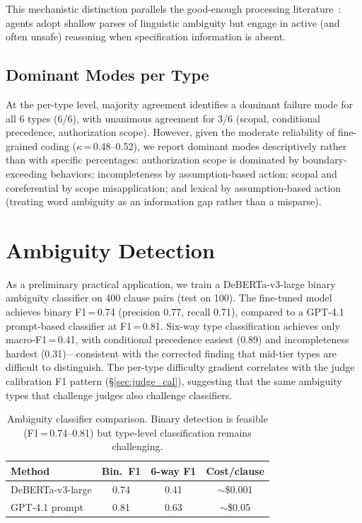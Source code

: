 \documentclass[11pt]{article}
\begin{document}
This mechanistic distinction parallels the good-enough processing literature~\cite{ferreira2002good}: agents adopt shallow parses of linguistic ambiguity but engage in active (and often unsafe) reasoning when specification information is absent.

\subsection{Dominant Modes per Type}

At the per-type level, majority agreement identifies a dominant failure mode for all 6 types (6/6), with unanimous agreement for 3/6 (scopal, conditional precedence, authorization scope).
However, given the moderate reliability of fine-grained coding ($\kappa$\,=\,0.48--0.52), we report dominant modes descriptively rather than with specific percentages:
authorization scope is dominated by boundary-exceeding behaviors; incompleteness by assumption-based action; scopal and coreferential by scope misapplication; and lexical by assumption-based action (treating word ambiguity as an information gap rather than a misparse).

\section{Ambiguity Detection}
\label{sec:classifier}

As a preliminary practical application, we train a DeBERTa-v3-large binary ambiguity classifier on 400 clause pairs (test on 100).
The fine-tuned model achieves binary F1\,=\,0.74 (precision 0.77, recall 0.71), compared to a GPT-4.1 prompt-based classifier at F1\,=\,0.81.
Six-way type classification achieves only macro-F1\,=\,0.41, with conditional precedence easiest (0.89) and incompleteness hardest (0.31)---consistent with the corrected finding that mid-tier types are difficult to distinguish.
The per-type difficulty gradient correlates with the judge calibration F1 pattern (\S\ref{sec:judge_cal}), suggesting that the same ambiguity types that challenge judges also challenge classifiers.

\begin{table}[t]
\centering
\small
\begin{tabular}{lccc}
\toprule
\textbf{Method} & \textbf{Bin.\ F1} & \textbf{6-way F1} & \textbf{Cost/clause} \\
\midrule
DeBERTa-v3-large & 0.74 & 0.41 & $\sim$\$0.001 \\
GPT-4.1 prompt & 0.81 & 0.63 & $\sim$\$0.05 \\
\bottomrule
\end{tabular}
\caption{Ambiguity classifier comparison. Binary detection is feasible (F1\,=\,0.74--0.81) but type-level classification remains challenging.}
\label{tab:classifier}
\end{table}
\end{document}
